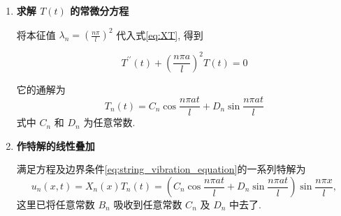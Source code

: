 \begin{enumerate}
\begin{itemize}
        这是关于 $A$、$B$ 的线性齐次方程组, 由于系数行列式不为零, 故 $A=B=0$. 因此 $\lambda<0$ 时, $X(x)$ 无非零解.

    \item 若 $\lambda=0$, 这时方程成为 $X^{\prime \prime}(x)=0$, 它的通解为 $X(x)=A x+B$.

        由边界条件 $X(0)=X(l)=0$ 得 $A=B=0, X(x)$ 也无非零解.
    
    \item 若 $\lambda>0$, 方程的通解为 $X(x)=A \cos \sqrt{\lambda} x+B \sin \sqrt{\lambda} x$.

        由边界条件 $X(0)=0$, 得 $A=0$. 由 $X(l)=0$ 得 $B \sin \sqrt{\lambda} l=0$. 非零解要求 $B \neq 0$, 故
        
        $$
        \sin \sqrt{\lambda} l=0 \quad \text { 即 } \sqrt{\lambda}=\frac{n \pi}{l}, \quad n=1,2, \cdots
        $$
        
        因此本征值 (加上脚标 $n$ ) 及相应的本征函数分别为
        
        $$
        \lambda_{n}=\left(\frac{n \pi}{l}\right)^{2}, \quad n=1,2, \cdots
        $$
        
        $$
        X_{n}(x)=B_{n} \sin \frac{n \pi x}{l}, \quad n=1,2, \cdots
        $$
\end{itemize}





  \item \textbf{求解 $T(t)$ 的常微分方程}
  
    将本征值 $\lambda_{n}=\left(\frac{n \pi}{l}\right)^{2}$ 代入式\eqref{eq:XT}, 得到

    $$
    T^{\prime \prime}(t)+\left(\frac{n \pi a}{l}\right)^{2} T(t)=0
    $$

    它的通解为
    $$
    T_{n}(t)=C_{n} \cos \frac{n \pi a t}{l}+D_{n} \sin \frac{n \pi a t}{l}
    $$
    式中 $C_{n}$ 和 $D_{n}$ 为任意常数.
    
    \item \textbf{作特解的线性叠加}
    
    满足方程及边界条件\eqref{eq:string_vibration_equation}的一系列特解为
    \begin{equation}
        u_{n}(x, t)=X_{n}(x) T_{n}(t)=\left(C_{n} \cos \frac{n \pi a t}{l}+D_{n} \sin \frac{n \pi a t}{l}\right) \sin \frac{n \pi x}{l}, 
        \label{eq:special_solution}
    \end{equation}
    这里已将任意常数 $B_{n}$ 吸收到任意常数 $C_{n}$ 及 $D_{n}$ 中去了.
    

\end{enumerate}
